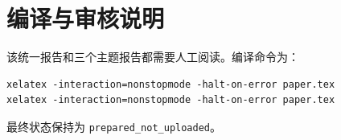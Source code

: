 \documentclass[UTF8]{ctexart}
\begin{document}
\section{编译与审核说明}
该统一报告和三个主题报告都需要人工阅读。编译命令为：
\begin{verbatim}
xelatex -interaction=nonstopmode -halt-on-error paper.tex
xelatex -interaction=nonstopmode -halt-on-error paper.tex
\end{verbatim}
最终状态保持为 \texttt{prepared\_not\_uploaded}。
\end{document}
